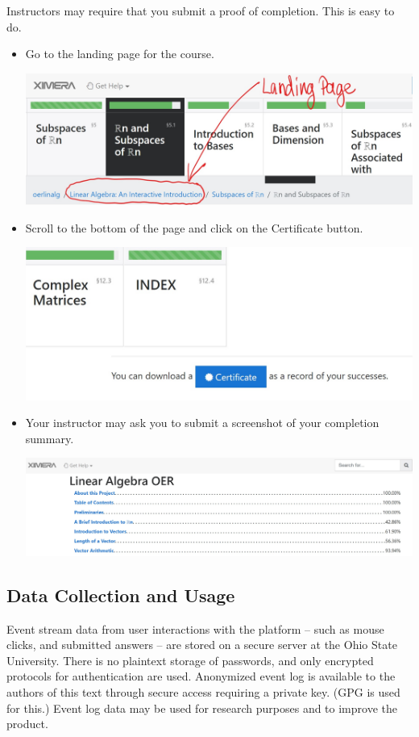 \documentclass{ximera}
\begin{document}
Instructors may require that you submit a proof of completion.  This is easy to do. 
\begin{itemize}
    \item Go to the landing page for the course.
    \begin{image}
\includegraphics{ximeraScreenshot1.jpg}
\end{image}
\item Scroll to the bottom of the page and click on the Certificate button.
\begin{image}
\includegraphics{ximeraScreenshot2.jpg}
\end{image}
\item
Your instructor may ask you to submit a screenshot of your completion summary.
\begin{image}
\includegraphics{ximeraScreenshot3.jpg}
\end{image}
\end{itemize}
\subsection*{Data Collection and Usage}
Event stream data from user interactions with the platform -- such as mouse clicks, and submitted answers -- are stored on a secure server at the Ohio State University.  There is no plaintext storage of passwords, and only encrypted protocols for authentication are used.  Anonymized event log is available to the authors of this text through secure access requiring a private key. (GPG is used for this.)   Event log data may be used for research purposes and to improve the product.
\end{document}
